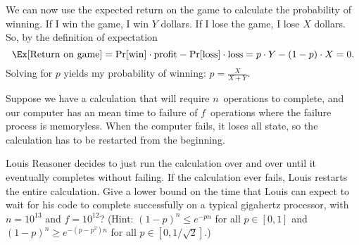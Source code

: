 \documentclass[12pt,twoside]{article}
\begin{document}
\begin{problems}
{We can now use the expected return on the game to calculate the probability of
winning. If I win the game, I win $Y$ dollars.  If I lose the game, I lose $X$
dollars.  So, by the definition of expectation
\[\Ex[\mathrm{Return\ on\ game}] = \Pr[\mathrm{win}] \cdot
\mathrm{profit} - \Pr[\mathrm{loss}] \cdot \mathrm{loss} = 
 p \cdot Y - (1-p) \cdot X = 0.
\]
Solving for $p$ yields my probability of winning: $p = \frac{X}{X+Y}$.
}

\problem

Suppose we have a calculation that will require $n$~operations to
complete, and our computer has an mean time to failure of
$f$~operations where the failure process is memoryless.  When the
computer fails, it loses all state, so the calculation has to be
restarted from the beginning.

\bparts

\ppart Louis Reasoner decides to just run the calculation over and
over until it eventually completes without failing. If the calculation
ever fails, Louis restarts the entire calculation. Give a lower bound
on the time that Louis can expect to wait for his code to complete
successfully on a typical gigahertz processor, with $n = 10^{13}$ and
$f = 10^{12}$? (Hint: $(1-p)^n \leq e^{-pn}$ for all $p \in [0,1]$ and
$(1-p)^n \geq e^{-(p-p^2)n}$ for all $p \in [0,1/\sqrt{2}]$.)



\end{problems}
\end{document}
